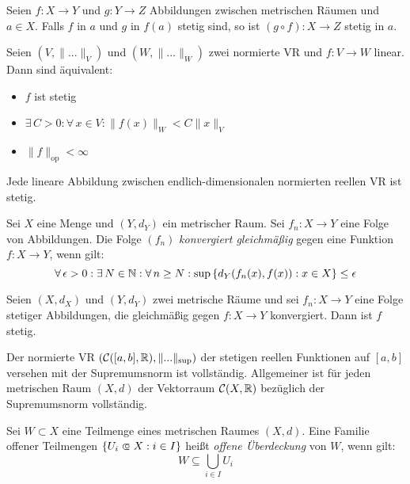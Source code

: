 \documentclass{cheat-sheet}
\begin{document}
\begin{satz}
Seien $f : X \to Y$ und $g : Y \to Z$ Abbildungen zwischen metrischen Räumen und $a \in X$. Falls $f$ in $a$ und $g$ in $f(a)$ stetig sind, so ist $(g \circ f) : X \to Z$ stetig in $a$.
\end{satz}


\begin{satz}
Seien $(V, \| ... \|_V)$ und $(W, \| ... \|_W)$ zwei normierte VR und $f : V \to W$ linear. Dann sind äquivalent:
\begin{itemize}
  \item $f$ ist stetig
  \item $\exists\,C > 0 : \forall\,x \in V : \| f(x) \|_W < C \| x \|_V$
  \item $\| f \|_\text{op} < \infty$
\end{itemize}
\end{satz}

\begin{kor}
Jede lineare Abbildung zwischen endlich-dimensionalen normierten reellen VR ist stetig.
\end{kor}

\begin{defn}
Sei $X$ eine Menge und $(Y, d_Y)$ ein metrischer Raum. Sei $f_n : X \to Y$ eine Folge von Abbildungen. Die Folge $(f_n)$ \emph{konvergiert gleichmäßig} gegen eine Funktion $f : X \to Y$, wenn gilt:
\[ \forall\,\epsilon > 0 : \exists\,N \in \mathbb{N} : \forall\,n \ge N : \sup\left\{ d_Y(f_n(x), f(x)) : x \in X \right\} \le \epsilon \]
\end{defn}

\begin{satz}
Seien $(X, d_X)$ und $(Y, d_Y)$ zwei metrische Räume und sei $f_n : X \to Y$ eine Folge stetiger Abbildungen, die gleichmäßig gegen $f : X \to Y$ konvergiert. Dann ist $f$ stetig.
\end{satz}

\begin{kor}
Der normierte VR $(\mathcal{C}([a, b], \mathbb{R}), \| ... \|_{\sup})$ der stetigen reellen Funktionen auf $[a, b]$ versehen mit der Supremumsnorm ist vollständig. Allgemeiner ist für jeden metrischen Raum $(X, d)$ der Vektorraum $\mathcal{C}(X, \mathbb{R})$ bezüglich der Supremumsnorm vollständig.
\end{kor}

\begin{defn}
Sei $W \subset X$ eine Teilmenge eines metrischen Raumes $(X, d)$. Eine Familie offener Teilmengen $\{ U_i \opn X : i \in I \}$ heißt \emph{offene Überdeckung} von $W$, wenn gilt:
\[ W \subseteq \bigcup_{i \in I} U_i \]
\end{defn}
\end{document}
